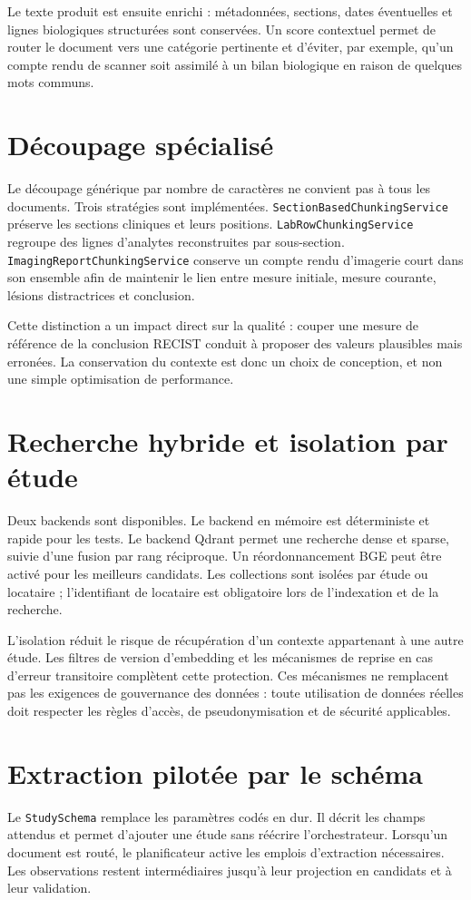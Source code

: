 Le texte produit est ensuite enrichi : métadonnées, sections, dates éventuelles et lignes biologiques structurées sont conservées. Un score contextuel permet de router le document vers une catégorie pertinente et d'éviter, par exemple, qu'un compte rendu de scanner soit assimilé à un bilan biologique en raison de quelques mots communs.

\section{Découpage spécialisé}
Le découpage générique par nombre de caractères ne convient pas à tous les documents. Trois stratégies sont implémentées. \texttt{SectionBasedChunkingService} préserve les sections cliniques et leurs positions. \texttt{LabRowChunkingService} regroupe des lignes d'analytes reconstruites par sous-section. \texttt{ImagingReportChunkingService} conserve un compte rendu d'imagerie court dans son ensemble afin de maintenir le lien entre mesure initiale, mesure courante, lésions distractrices et conclusion.

Cette distinction a un impact direct sur la qualité : couper une mesure de référence de la conclusion RECIST conduit à proposer des valeurs plausibles mais erronées. La conservation du contexte est donc un choix de conception, et non une simple optimisation de performance.

\section{Recherche hybride et isolation par étude}
Deux backends sont disponibles. Le backend en mémoire est déterministe et rapide pour les tests. Le backend Qdrant permet une recherche dense et sparse, suivie d'une fusion par rang réciproque. Un réordonnancement BGE peut être activé pour les meilleurs candidats. Les collections sont isolées par étude ou locataire ; l'identifiant de locataire est obligatoire lors de l'indexation et de la recherche.

L'isolation réduit le risque de récupération d'un contexte appartenant à une autre étude. Les filtres de version d'embedding et les mécanismes de reprise en cas d'erreur transitoire complètent cette protection. Ces mécanismes ne remplacent pas les exigences de gouvernance des données : toute utilisation de données réelles doit respecter les règles d'accès, de pseudonymisation et de sécurité applicables.

\section{Extraction pilotée par le schéma}
Le \texttt{StudySchema} remplace les paramètres codés en dur. Il décrit les champs attendus et permet d'ajouter une étude sans réécrire l'orchestrateur. Lorsqu'un document est routé, le planificateur active les emplois d'extraction nécessaires. Les observations restent intermédiaires jusqu'à leur projection en candidats et à leur validation.

